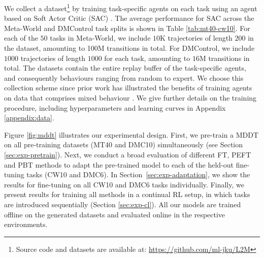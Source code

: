 \documentclass{article}
\begin{document}
We collect a dataset\footnote{Source code and datasets are available at: \url{https://github.com/ml-jku/L2M}} by training task-specific agents on each task using an agent based on Soft Actor Critic (SAC)  \citep{Haarnoja:18}.
The average performance for SAC across the Meta-World and DMControl task splits is shown in Table \ref{tab:mt40-cw10}. 
For each of the $50$ tasks in Meta-World, we include $10$K trajectories of length $200$ in the dataset, amounting to 100M transitions in total. 
For DMControl, we include $1000$ trajectories of length $1000$ for each task, amounting to $16$M transitions in total.
The datasets contain the entire replay buffer of the task-specific agents, and consequently behaviours ranging from random to expert.
We choose this collection scheme since prior work has illustrated the benefits of training agents on data that comprises mixed behaviour \citep{Lee:22}.
We give further details on the training procedure, including hyperparameters and learning curves in Appendix \ref{appendix:data}.
\begin{table}[h]
\centering
    \caption{Performance measures of task specific SAC-based agents used for data collection averaged over the different task splits. Mean and standard deviation are shown.}
    \hspace{1cm}
    \label{tab:mt40-cw10}
\end{table}

Figure \ref{fig:mddt} illustrates our experimental design.
First, we pre-train a MDDT on all pre-training datasets (MT40 and DMC10) simultaneously (see Section \ref{sec:exp-pretrain}). 
Next, we conduct a broad evaluation of different FT, PEFT and PBT methods to adapt the pre-trained model to each of the held-out fine-tuning tasks (CW10 and DMC6).
In Section~\ref{sec:exp-adaptation}, we show the results for fine-tuning on all CW10 and DMC6 tasks individually.
Finally, we present results for training all methods in a continual RL setup, in which tasks are introduced sequentially (Section \ref{sec:exp-cl}). 
All our models are trained offline on the generated datasets and evaluated online in the respective environments.
\end{document}
